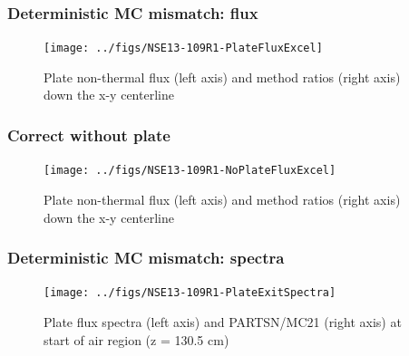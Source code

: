 \documentclass[xcolor=x11names,compress, handout]{beamer}
\renewcommand{\(}{\begin{columns}}
\renewcommand{\)}{\end{columns}}
\newcommand{\<}[1]{\begin{column}{#1}}
\renewcommand{\>}{\end{column}}
\begin{document}
\begin{frame}[fragile]
  \frametitle{Deterministic MC mismatch: flux}
 \begin{figure}[p]
   \begin{center}
     \texttt{[image: ../figs/NSE13-109R1-PlateFluxExcel]}
   \end{center}
   \caption{Plate non-thermal flux (left axis) and method ratios (right axis) down the x-y centerline}
   \label{fig:PlateFlux}
 \end{figure}
\end{frame}


\begin{frame}[fragile]
  \frametitle{Correct without plate}
 \begin{figure}[p]
   \begin{center}
     \texttt{[image: ../figs/NSE13-109R1-NoPlateFluxExcel]}
   \end{center}
   \caption{Plate non-thermal flux (left axis) and method ratios (right axis) down the x-y centerline}
   \label{fig:noPlateFlux}
 \end{figure}
\end{frame}


\begin{frame}[fragile]
  \frametitle{Deterministic MC mismatch: spectra}
 \begin{figure}[p]
   \begin{center}
     \texttt{[image: ../figs/NSE13-109R1-PlateExitSpectra]}
   \end{center}
   \caption{Plate flux spectra (left axis) and PARTSN/MC21 (right axis) at start of air region (z = 130.5 cm)}
   \label{fig:PlateExit}
 \end{figure}
\end{frame}
\end{document}
